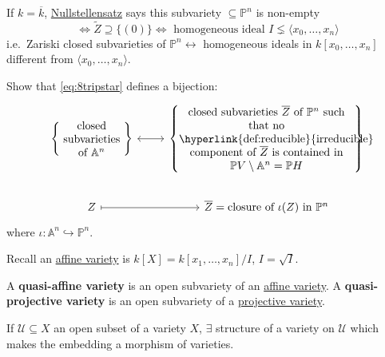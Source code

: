 \documentclass{article}
\newcommand{\A}{\mathbb{A}}
\newcommand{\proj}{\mathbb{P}}
\begin{document}
If $k = \overline{k}$, \hyperlink{def:null2}{Nullstellensatz} says this subvariety $\subseteq \proj^n$ is non-empty
\begin{equation*}
    \iff \tilde{Z} \supseteq \{(0)\} \iff \text{ homogeneous ideal } I \lneq \langle x_0, \dotsc, x_n \rangle
\end{equation*}
i.e.\ Zariski closed subvarieties of $\proj^n \longleftrightarrow$ homogeneous ideals in $k[x_0, \dotsc, x_n]$ different from $\langle x_0, \dotsc, x_n \rangle$.
\begin{ex}
    Show that \eqref{eq:8tripstar} defines a bijection:
    \begin{equation*}
        \begin{tikzcd}
            \left\{\parbox{2cm}{\centering closed subvarieties of $\A^n$}\right\} \rar[leftrightarrow]&
            \left\{\parbox{5.5cm}{\centering closed subvarieties $\overline{Z}$ of $\proj^n$ such that no \hyperlink{def:reducible}{irreducible} component of $\overline{Z}$ is contained in $\proj V \setminus \A^n = \proj H$ }\right\} \\
            Z \rar[mapsto] &\overline{Z} = \text{closure of } \iota(Z) \text{ in } \proj^n
        \end{tikzcd}
    \end{equation*}
    where $\iota: \A^n \hookrightarrow \proj^n$.
\end{ex}
Recall an \hyperlink{def:affVar}{affine variety} is $k[X] = k[x_1, \dotsc, x_n]/I$, $I = \sqrt{I}$.
\begin{defi}[Quasivarieties]
    A \textbf{quasi-affine variety} is an open subvariety of an \hyperlink{def:affVar}{affine variety}.
    A \textbf{quasi-projective variety} is an open subvariety of a \hyperlink{def:projVar}{projective variety}.
\end{defi}
\begin{ex}
    If $\mathcal{U} \subseteq X$ an open subset of a variety $X$, $\exists$ structure of a variety on $\mathcal{U}$ which makes the embedding a morphism of varieties.
\end{ex}

\clearpage
\end{document}
